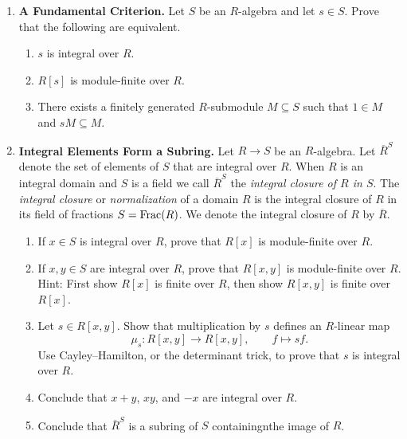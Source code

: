 \documentclass[12pt,reqno]{amsart}
\begin{document}
\begin{enumerate}[leftmargin=*, resume=problems]
\item \textbf{A Fundamental Criterion.} Let $S$ be an $R$-algebra and let $s\in S$. Prove that the following are equivalent.
\begin{enumerate}
    \item $s$ is integral over $R$.
    \item $R[s]$ is module-finite over $R$.
    \item There exists a finitely generated $R$-submodule $M\subseteq S$ such that $1\in M$ and $sM\subseteq M$.
\end{enumerate}

\item \textbf{Integral Elements Form a Subring.} Let $R \to S$ be an $R$-algebra. Let $\overline{R}^{S}$ denote the set of elements of $S$ that are integral over $R$. When $R$ is an integral domain and $S$ is a field we call $\overline{R}^{S}$ the \emph{integral closure of $R$ in $S$}. The \emph{integral closure} or \emph{normalization} of a domain $R$ is the integral closure of $R$ in its field of fractions $S=\operatorname{Frac}(R)$. We denote the integral closure of $R$ by $\overline{R}$. 
\begin{enumerate}
    \item If $x\in S$ is integral over $R$, prove that $R[x]$ is module-finite over $R$.

    \item If $x,y\in S$ are integral over $R$, prove that $R[x,y]$ is module-finite over $R$. Hint: First show $R[x]$ is finite over $R$, then show $R[x,y]$ is finite over $R[x]$.

    \item Let $s\in R[x,y]$. Show that multiplication by $s$ defines an
    $R$-linear map
    \[
    \mu_s:R[x,y]\longrightarrow R[x,y],
    \qquad
    f \longmapsto sf.
    \]
    Use Cayley--Hamilton, or the determinant trick, to prove that $s$ is
    integral over $R$.

    \item Conclude that $x+y$, $xy$, and $-x$ are integral over $R$.

    \item Conclude that $\overline{R}^{S}$ is a subring of $S$ containingnthe image of $R$.


\end{enumerate}


\end{enumerate}
\end{document}
